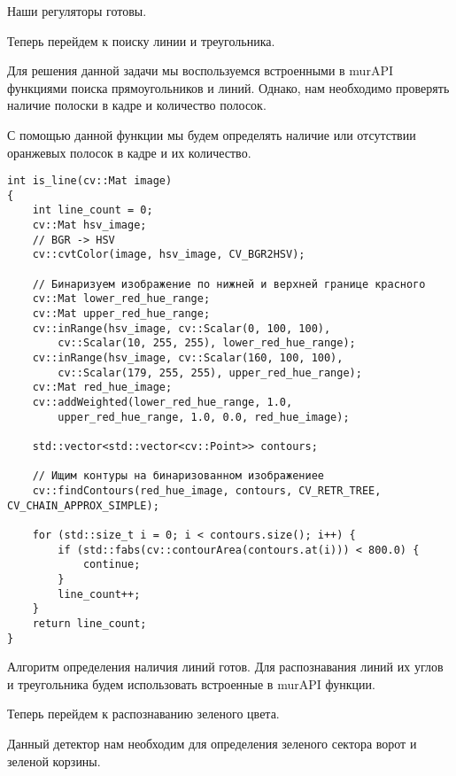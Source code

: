 Наши регуляторы готовы. 

Теперь перейдем к поиску линии и треугольника. 

Для решения данной задачи мы воспользуемся встроенными в murAPI функциями поиска прямоугольников и линий. Однако, нам необходимо проверять наличие полоски в кадре и количество полосок. 

С помощью данной функции мы будем определять наличие или отсутствии оранжевых полосок в кадре и их количество.

\begin{verbatim}
int is_line(cv::Mat image)
{
    int line_count = 0;
    cv::Mat hsv_image;
    // BGR -> HSV
    cv::cvtColor(image, hsv_image, CV_BGR2HSV);

    // Бинаризуем изображение по нижней и верхней границе красного
    cv::Mat lower_red_hue_range;
    cv::Mat upper_red_hue_range;
    cv::inRange(hsv_image, cv::Scalar(0, 100, 100), 
        cv::Scalar(10, 255, 255), lower_red_hue_range);
    cv::inRange(hsv_image, cv::Scalar(160, 100, 100), 
        cv::Scalar(179, 255, 255), upper_red_hue_range);
    cv::Mat red_hue_image;
    cv::addWeighted(lower_red_hue_range, 1.0, 
        upper_red_hue_range, 1.0, 0.0, red_hue_image);

    std::vector<std::vector<cv::Point>> contours;

    // Ищим контуры на бинаризованном изображениее
    cv::findContours(red_hue_image, contours, CV_RETR_TREE, CV_CHAIN_APPROX_SIMPLE);

    for (std::size_t i = 0; i < contours.size(); i++) {
        if (std::fabs(cv::contourArea(contours.at(i))) < 800.0) {
            continue;
        }
        line_count++;
    }
    return line_count;
}
\end{verbatim}

Алгоритм определения наличия линий готов. Для распознавания линий их углов и треугольника будем использовать встроенные в murAPI функции. 

Теперь перейдем к распознаванию зеленого цвета.

Данный детектор нам необходим для определения зеленого сектора ворот и зеленой корзины.

